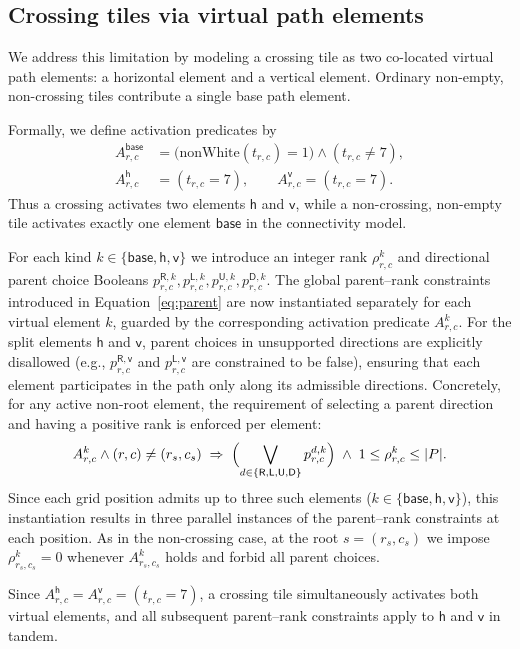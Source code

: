 \documentclass[letterpaper,11pt]{article}
\newcommand{\kind}[1]{\mathsf{#1}}
\begin{document}
\subsection*{Crossing tiles via virtual path elements}

We address this limitation by modeling a crossing tile as two
co-located virtual path elements: a horizontal element and a vertical
element. Ordinary non-empty, non-crossing tiles contribute a single
base path element.

Formally, we define activation predicates by
\[
\begin{aligned}
A^{\kind{base}}_{r,c}
&= \bigl(\mathrm{nonWhite}(t_{r,c})=1\bigr)\wedge (t_{r,c}\neq 7),
\\
A^{\kind{h}}_{r,c}
&= (t_{r,c}=7),
\qquad
A^{\kind{v}}_{r,c}
= (t_{r,c}=7).
\end{aligned}
\]
Thus a crossing activates two elements \(\kind{h}\) and \(\kind{v}\),
while a non-crossing, non-empty tile activates exactly one element
\(\kind{base}\) in the connectivity model.

For each kind \(k\in\{\kind{base},\kind{h},\kind{v}\}\) we introduce
an integer rank \(\rho^{k}_{r,c}\) and directional parent choice
Booleans
\(p^{\kind{R},k}_{r,c},p^{\kind{L},k}_{r,c},p^{\kind{U},k}_{r,c},p^{\kind{D},k}_{r,c}\). The
global parent--rank constraints introduced in
Equation~\eqref{eq:parent} are now instantiated separately for each
virtual element \(k\), guarded by the corresponding activation
predicate \(A^{k}_{r,c}\). For the split elements \(\kind{h}\) and
\(\kind{v}\), parent choices in unsupported directions are explicitly
disallowed (e.g., \(p^{\kind{R},\kind{v}}_{r,c}\) and
\(p^{\kind{L},\kind{v}}_{r,c}\) are constrained to be false), ensuring that
each element participates in the path only along its admissible
directions. Concretely, for any active non-root element, the
requirement of selecting a parent direction and having a positive rank
is enforced per element:
\[
A^{k}_{r,c}\wedge (r,c)\neq (r_s,c_s)\;\Rightarrow\;
\Bigl(\bigvee_{d\in\{\kind{R},\kind{L},\kind{U},\kind{D}\}} p^{d,k}_{r,c}\Bigr)
\;\wedge\; 1\le \rho^{k}_{r,c}\le |P|.
\]
Since each grid position admits up to three such elements
(\(k\in\{\kind{base},\kind{h},\kind{v}\}\)), this instantiation
results in three parallel instances of the parent--rank constraints at
each position. As in the non-crossing case, at the root
\(s=(r_s,c_s)\) we impose \(\rho^{k}_{r_s,c_s}=0\) whenever
\(A^{k}_{r_s,c_s}\) holds and forbid all parent choices.

Since \(A^{\kind{h}}_{r,c}=A^{\kind{v}}_{r,c}=(t_{r,c}=7)\), a
crossing tile simultaneously activates both virtual elements, and all
subsequent parent--rank constraints apply to \(\kind{h}\) and
\(\kind{v}\) in tandem.
\end{document}
